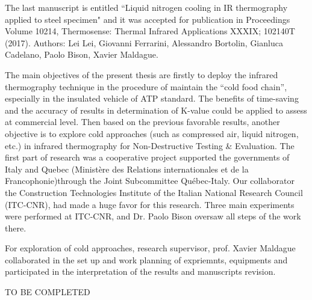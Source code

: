 The last manuscript is entitled ``Liquid nitrogen cooling in IR thermography applied to steel specimen" and it was accepted for publication in Proceedings Volume 10214, Thermosense: Thermal Infrared Applications XXXIX; 102140T (2017). Authors: Lei Lei, Giovanni Ferrarini, Alessandro Bortolin, Gianluca Cadelano, Paolo Bison, Xavier Maldague.

The main objectives of the present thesis are firstly to deploy the infrared thermography technique in the procedure of maintain the ``cold food chain'', especially in the insulated vehicle of ATP standard. The benefits of time-saving and the accuracy of results in determination of K-value could be applied to assess at commercial level. Then based on the previous favorable results, another objective is to explore cold approaches (such as compressed air, liquid nitrogen, etc.) in infrared thermography for Non-Destructive Testing \& Evaluation. The first part of research was a cooperative project supported the governments of Italy and Quebec (Ministère des Relations internationales et de la Francophonie)through the Joint Subcommittee Québec-Italy. Our collaborator the Construction Technologies Institute of the Italian National Research Council (ITC-CNR), had made a huge favor for this research. Three main experiments were performed at ITC-CNR, and Dr. Paolo Bison oversaw all steps of the work there.

For exploration of cold approaches, research supervisor, prof. Xavier Maldague collaborated in the set up and work planning of expriemnts, equipments and participated in the interpretation of the results and manuscripts revision.

\huge TO BE COMPLETED


